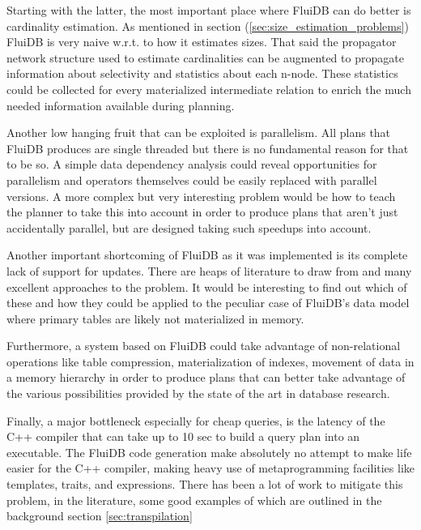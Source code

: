 Starting with the latter, the most important place where FluiDB can do
better is cardinality estimation. As mentioned in section
(\ref{sec:size_estimation_problems}) FluiDB is very naive w.r.t. to
how it estimates sizes. That said the propagator network structure
used to estimate cardinalities can be augmented to propagate
information about selectivity and statistics about each n-node. These
statistics could be collected for every materialized intermediate
relation to enrich the much needed information available during
planning.

Another low hanging fruit that can be exploited is parallelism. All
plans that FluiDB produces are single threaded but there is no
fundamental reason for that to be so. A simple data dependency
analysis could reveal opportunities for parallelism and operators
themselves could be easily replaced with parallel versions. A more
complex but very interesting problem would be how to teach the planner
to take this into account in order to produce plans that aren't just
accidentally parallel, but are designed taking such speedups into
account.

Another important shortcoming of FluiDB as it was implemented is its
complete lack of support for updates. There are heaps of literature to
draw from and many excellent approaches to the problem. It would be
interesting to find out which of these and how they could be applied
to the peculiar case of FluiDB's data model where primary tables are
likely not materialized in memory.

Furthermore, a system based on FluiDB could take advantage of
non-relational operations like table compression, materialization of
indexes, movement of data in a memory hierarchy in order to produce
plans that can better take advantage of the various possibilities
provided by the state of the art in database research.

Finally, a major bottleneck especially for cheap queries, is the
latency of the C++ compiler that can take up to 10 sec to build a
query plan into an executable. The FluiDB code generation make
absolutely no attempt to make life easier for the C++ compiler, making
heavy use of metaprogramming facilities like templates, traits, and
 expressions. There has been a lot of work to mitigate
this problem, in the literature, some good examples of which are
outlined in the background section \ref{sec:transpilation}
